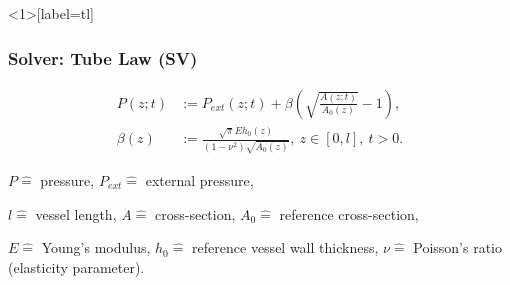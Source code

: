 \documentclass[compress]{beamer}
\begin{document}

\begin{frame}<1>[label=tl]
	\frametitle{Solver: Tube Law (SV)}
	\begin{align}
		P(z;t) &:= P_{ext}(z;t) + \beta \left( \sqrt{\frac{A(z;t)}{A_0(z)}}-1 \right),      \label{eq:p_tot}\\
		\beta(z) &:=  \frac{\sqrt{\pi} E h_0(z)}{(1-\nu^2) \sqrt{A_0(z)}},\  z \in \left[ 0,l \right], \ t > 0. 
	\end{align}

	\vfill

	{\tiny \centering 
		$P \hat{=}$ pressure,
		$P_{ext} \hat{=}$ external pressure,

		$l \hat{=}$ vessel length,
		$A \hat{=}$ cross-section,
		$A_0 \hat{=}$ reference cross-section,

		$E \hat{=}$ Young's modulus,
		$h_0 \hat{=}$ reference vessel wall thickness,
		$\nu \hat{=}$ Poisson's ratio (elasticity parameter). 
	\par}
\end{frame}

\end{document}

